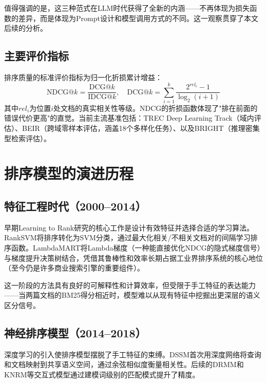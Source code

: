 \documentclass[12pt,a4paper]{article}
\begin{document}
值得强调的是，这三种范式在LLM时代获得了全新的内涵——不再体现为损失函数的差异，而是体现为Prompt设计和模型调用方式的不同。这一观察贯穿了本文后续的分析。

\subsection{主要评价指标}

排序质量的标准评价指标为归一化折损累计增益：
\begin{equation}
\text{NDCG@}k = \frac{\text{DCG@}k}{\text{IDCG@}k}, \quad \text{DCG@}k = \sum_{i=1}^{k}\frac{2^{rel_i} - 1}{\log_2(i+1)}
\end{equation}
其中$rel_i$为位置$i$处文档的真实相关性等级。NDCG的折损函数体现了"排在前面的错误代价更高"的直觉。当前主流基准包括：TREC Deep Learning Track\cite{craswell2020overview}（域内评估）、BEIR\cite{thakur2021beir}（跨域零样本评估，涵盖18个多样化任务）、以及BRIGHT\cite{su2024bright}（推理密集型检索评估）。

\section{排序模型的演进历程}

\subsection{特征工程时代（2000--2014）}

早期Learning to Rank研究的核心工作是设计有效特征并选择合适的学习算法。RankSVM\cite{joachims2002optimizing}将排序转化为SVM分类，通过最大化相关/不相关文档对的间隔学习排序函数。LambdaMART\cite{burges2010ranknet}将Lambda梯度（一种能直接优化NDCG的隐式梯度信号）与梯度提升决策树结合，凭借其鲁棒性和效率长期占据工业界排序系统的核心地位（至今仍是许多商业搜索引擎的重要组件）。

这一阶段的方法具有良好的可解释性和计算效率，但受限于手工特征的表达能力——当两篇文档的BM25得分相近时，模型难以从现有特征中挖掘出更深层的语义区分信号。

\subsection{神经排序模型（2014--2018）}

深度学习的引入使排序模型摆脱了手工特征的束缚。DSSM\cite{huang2013learning}首次用深度网络将查询和文档映射到共享语义空间，通过余弦相似度衡量相关性。后续的DRMM\cite{guo2016deep}和KNRM\cite{xiong2017end}等交互式模型通过建模词级别的匹配模式提升了精度。
\end{document}
